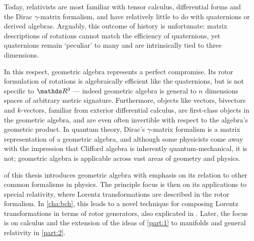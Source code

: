 Today, relativists are most familiar with tensor calculus, differential forms and the Dirac $γ$-matrix formalism, and have relatively little to do with quaternions or derived algebras.
Arguably, this outcome of history is unfortunate: matrix descriptions of rotations cannot match the efficiency of quaternions, yet quaternions remain `peculiar' to many and are intrinsically tied to three dimensions.

In this respect, geometric algebra represents a perfect compromise.
Its rotor formulation of rotations is algebraically efficient like the quaternions, but is not specific to $\RR^3$ --- indeed geometric algebra is general to $n$ dimensions spaces of arbitrary metric signature.
Furthermore, objects like vectors, bivectors and $k$-vectors, familiar from exterior differential calculus, are first-class objects in the geometric algebra, and are even often invertible with respect to the algebra's geometric product.
In quantum theory, Dirac's $γ$-matrix formalism is a matrix representation of a geometric algebra, and although some physicists come away with the impression that Clifford algebra is inherently quantum-mechanical, it is not; geometric algebra is applicable across vast areas of geometry and physics.

 of this thesis introduces geometric algebra with emphasis on its relation to other common formalisms in physics.
The principle focus is then on its applications to special relativity, where Lorentz transformations are described in the rotor formalism.
In \cref{cha:bch}, this leads to a novel technique for composing Lorentz transformations in terms of rotor generators, also explicated in \cite{wilson2021ga-bch}.
Later, the focus is on calculus and the extension of the ideas of \cref{part:1} to manifolds and general relativity in \cref{part:2}.
